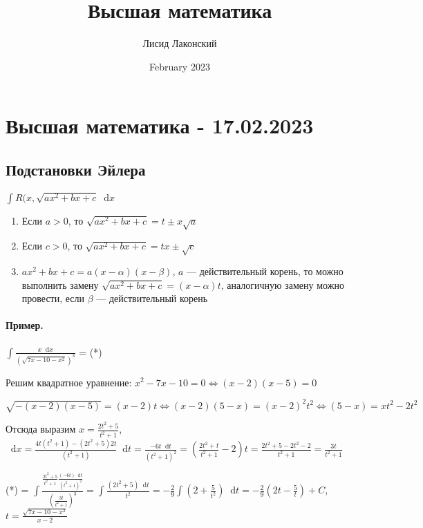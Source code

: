 \documentclass{article}
\title{Высшая математика}
\author{Лисид Лаконский}
\date{February 2023}
\newcommand*\diff{\mathop{}\!\mathrm{d}}
\begin{document}
\raggedright

\maketitle

\tableofcontents
\pagebreak

\section{Высшая математика - 17.02.2023}

\subsection{Подстановки Эйлера}

$\int R (x, \sqrt{ax^2 + bx + c} \diff x$

\begin{enumerate}
    \item Если $a > 0$, то $\sqrt{a x^2 + bx + c} = t \pm x \sqrt{a}$
    \item Если $c > 0$, то $\sqrt{a x^2 + bx + c} = t x \pm \sqrt{c}$
    \item $a x^2 + b x + c = a (x - \alpha) (x - \beta)$, $a$ — действительный корень, то можно выполнить замену $\sqrt{a x^2 + b x + c} = (x - \alpha) t$, аналогичную замену можно провести, если $\beta$ — действительный корень
\end{enumerate}

\paragraph{Пример. } $\int \frac{x \diff x}{(\sqrt{7x - 10 - x^2})^3}$ = (*)

\hfill

Решим квадратное уравнение: $x^2 - 7x - 10 = 0 \Longleftrightarrow (x - 2)(x - 5) = 0$

$\sqrt{-(x - 2)(x - 5)} = (x - 2) t \Longleftrightarrow (x - 2) (5 - x) = (x - 2)^2 t^2 \Longleftrightarrow (5 - x) = x t^2 - 2t^2$

Отсюда выразим $x = \frac{2t^2 + 5}{t^2 + 1}$, $\diff x = \frac{4t (t^2 + 1) - (2t^2 + 5) 2 t}{(t^2 + 1)} \diff t = \frac{-6 t \diff t}{(t^2 + 1)^2} = (\frac{2t^2 + t}{t^2 + 1} - 2) t = \frac{2t^2 + 5 - 2t^2 - 2}{t^2 + 1} = \frac{3t}{t^2 + 1}$

\hfill

(*) = $\int \frac{\frac{2t^2 + 5}{t^2 + 1} \frac{(-6t) \diff t}{(t^2 + 1)^2}}{(\frac{3t}{t^2 + 1})^3} = \int \frac{(2t^2 + 5) \diff t}{t^2} = -\frac{2}{9} \int (2 + \frac{5}{t^2}) \diff t = - \frac{2}{9} (2t - \frac{5}{t}) + C$, \ $t = \frac{\sqrt{7x-10-x^2}}{x-2}$
\end{document}
